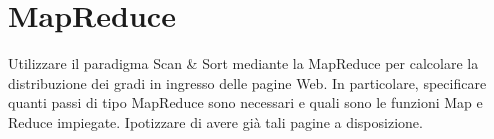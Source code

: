 \chapter{MapReduce}

\begin{problem*}
    Utilizzare il paradigma Scan \& Sort mediante la MapReduce per calcolare la
    distribuzione dei gradi in ingresso delle pagine Web. In particolare, specificare
    quanti passi di tipo MapReduce sono necessari e quali sono le funzioni Map e
    Reduce impiegate. Ipotizzare di avere gi\`a tali pagine a disposizione.
\end{problem*}

